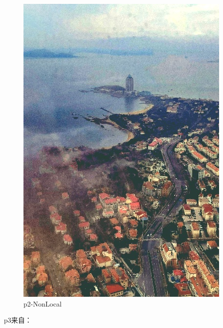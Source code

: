 \documentclass[12pt]{article}
\begin{document}
\begin{figure}[!h]
\begin{minipage}[t]{0.24\linewidth}
        \includegraphics[width=0.9\linewidth]{sample_pictures/after_p2_NonLocal.jpg}
        \caption*{p2-NonLocal}
    \end{minipage}
 \end{figure}\par
 p3来自：\cite{2011Single}
\end{document}
